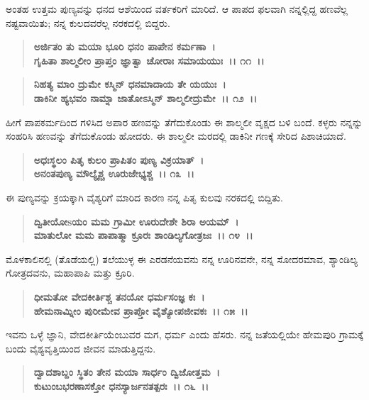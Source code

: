 ಅಂತಹ ಉತ್ತಮ ಪುಣ್ಯವನ್ನು ಧನದ ಆಶೆಯಿಂದ ವರ್ತಕರಿಗೆ ಮಾರಿದೆ. ಆ ಪಾಪದ ಫಲವಾಗಿ ನನ್ನಲ್ಲಿದ್ದ ಹಣವೆಲ್ಲ ನಷ್ಟವಾಯಿತು; ನನ್ನ ಕುಲದವರೆಲ್ಲ ನರಕದಲ್ಲಿ ಬಿದ್ದರು.

\begin{verse}
\textbf{ಅರ್ಜಿತಂ ತು ಮಯಾ ಭೂರಿ ಧನಂ ಪಾಪೇನ ಕರ್ಮಣಾ~।}\\\textbf{ಗೃಹಿತಾ ಶಾಲ್ಮಲೀಂ ಪ್ರಾಪ್ತಂ ಜ್ಞಾತ್ವಾ ಚೋರಾಃ ಸಮಾಯಯುಃ~।। ೧೧~।।}
\end{verse}

\begin{verse}
\textbf{ನಿಹತ್ಯ ಮಾಂ ದ್ರುಮೇ ಕಸ್ಮಿನ್ ಧನಮಾದಾಯ ತೇ ಯಯುಃ~।}\\\textbf{ಡಾಕಿನೀ ಹ್ಯಭವಂ ನಾಮ್ನಾ ಜಾತೋಽಸ್ಮಿನ್ ಶಾಲ್ಮಲೀದ್ರುಮೇ~।। ೧೨~।।}
\end{verse}

ಹೀಗೆ ಪಾಪಕರ್ಮದಿಂದ ಗಳಿಸಿದ ಅಪಾರ ಹಣವನ್ನು ತೆಗೆದುಕೊಂಡು ಈ ಶಾಲ್ಮಲೀ ವೃಕ್ಷದ ಬಳಿ ಬಂದೆ. ಕಳ್ಳರು ನನ್ನನ್ನು ಸಂಹರಿಸಿ ಹಣವನ್ನು ತೆಗೆದುಕೊಂಡು ಹೋದರು. ಈ ಶಾಲ್ಮಲೀ ಮರದಲ್ಲಿ ಡಾಕಿನೀ ಗಣಕ್ಕೆ ಸೇರಿದ ಪಿಶಾಚಿಯಾದೆ.

\begin{verse}
\textbf{ಅಧಃಸ್ಥಲಂ ಪಿತೃ ಕುಲಂ ಪ್ರಾಪಿತಂ ಪುಣ್ಯ ವಿಕ್ರಯಾತ್~।}\\\textbf{ಅನಂತಪುಣ್ಯ ಮೌಲ್ಯೈಶ್ಚ ಊರುಜೇಭ್ಯಶ್ಚ~।। ೧೩~।।}
\end{verse}

ಈ ಪುಣ್ಯವನ್ನು ಕ್ರಯಕ್ಕಾಗಿ ವೈಶ್ಯರಿಗೆ ಮಾರಿದ ಕಾರಣ ನನ್ನ ಪಿತೃ ಕುಲವು ನರಕದಲ್ಲಿ ಬಿದ್ದಿತು.

\begin{verse}
\textbf{ದ್ವಿತೀಯೋsಯಂ ಮಮ ಗ್ರಾಮೀ ಊರುದೇಶೇ ಶಿರಾ ಅಯಮ್~।}\\\textbf{ಮಾತುಲೋ ಮಮ ಪಾಪಾತ್ಮಾ ಕ್ರೂರಃ ಶಾಂಡಿಲ್ಯಗೋತ್ರಜಃ~।। ೧೪~।।}
\end{verse}

ಮೊಳಕಾಲಿನಲ್ಲಿ (ತೊಡೆಯಲ್ಲಿ) ತಲೆಯುಳ್ಳ ಈ ಎರಡನೆಯವನು ನನ್ನ ಊರಿನವನೇ, ನನ್ನ ಸೋದರಮಾವ, ಶ್ಯಾಂಡಿಲ್ಯ ಗೋತ್ರದವನು, ಮಹಾಪಾಪಿ ಮತ್ತು ಕ್ರೂರಿ.

\begin{verse}
\textbf{ಧೀಮತೋ ವೇದಕೀರ್ತಿಶ್ಚ ತನಯೋ ಧರ್ಮಸಂಜ್ಞ ಕಃ~।}\\\textbf{ಹೇಮನಾಮ್ನೀಂ ಪುರೀಮೇವ ಪ್ರಾಪ್ತೋ ವೈಶ್ಯೋಪಜೀವಕಃ~।। ೧೫~।।}
\end{verse}

ಇವನು ಒಳ್ಳೆ ಜ್ಞಾನಿ, ವೇದಕೀರ್ತಿಯೆಂಬುವರ ಮಗ, ಧರ್ಮ ಎಂದು ಹೆಸರು. ನನ್ನ ಜತೆಯಲ್ಲಿಯೇ ಹೇಮಪುರಿ ಗ್ರಾಮಕ್ಕೆ ಬಂದು ವೈಶ್ಯವೃತ್ತಿಯಿಂದ ಜೀವನ ಮಾಡುತ್ತಿದ್ದನು.

\begin{verse}
\textbf{ದ್ವಾದಶಾಬ್ದಂ ಸ್ಥಿತಂ ತೇನ ಮಯಾ ಸಾರ್ಧಂ ದ್ವಿಜೋತ್ತಮ~।}\\\textbf{ಕುಟುಂಬಭರಣಾಸಕ್ತೋ ಧನಸ್ಯಾರ್ಜನತತ್ಪರಃ~।। ೧೬~।।}
\end{verse}

